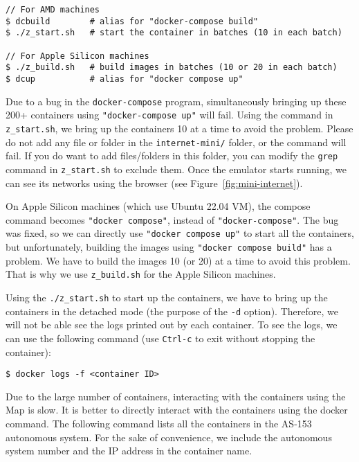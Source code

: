 \begin{lstlisting}
// For AMD machines
$ dcbuild        # alias for "docker-compose build" 
$ ./z_start.sh   # start the container in batches (10 in each batch)

// For Apple Silicon machines
$ ./z_build.sh   # build images in batches (10 or 20 in each batch)
$ dcup           # alias for "docker compose up"
\end{lstlisting}
 
Due to a bug in the \texttt{docker-compose} program, 
simultaneously bringing up these 200+ containers using 
\texttt{"docker-compose up"} will fail.
Using the command in \texttt{z\_start.sh}, we bring 
up the containers 10 at a time to avoid the problem. 
Please do not add any file or folder in the \texttt{internet-mini/}
folder, or the command will fail. 
If you do want to add files/folders in this folder, you can modify the 
\texttt{grep} command in \texttt{z\_start.sh} 
to exclude them. 
Once the emulator starts running, we can see its networks
using the browser (see Figure~\ref{fig:mini-internet}).


On Apple Silicon machines (which use Ubuntu 22.04 VM), the 
compose command becomes \texttt{"docker compose"}, instead 
of \texttt{"docker-compose"}. The bug was fixed, so 
we can directly use \texttt{"docker compose up"} to 
start all the containers, but unfortunately, building 
the images using \texttt{"docker compose build"} has a problem.
We have to build the images 10 (or 20) at a time to avoid this 
problem. That is why we use \texttt{z\_build.sh} for the Apple
Silicon machines.



Using the \texttt{./z\_start.sh} to start up the containers,
we have to bring up the containers in the detached
mode (the purpose of the \texttt{-d} option). Therefore, we will not be able
see the logs printed out by each container. To see the logs, 
we can use the following command (use \texttt{Ctrl-c} to
exit without stopping the container):

\begin{lstlisting}
$ docker logs -f <container ID>
\end{lstlisting}

Due to the large number of containers, interacting 
with the containers using the Map is slow. It is better to directly
interact with the containers using the docker command. 
The following command lists all the containers in the AS-153 autonomous
system. For the sake of convenience, we include the autonomous 
system number and the IP address in the container name.


